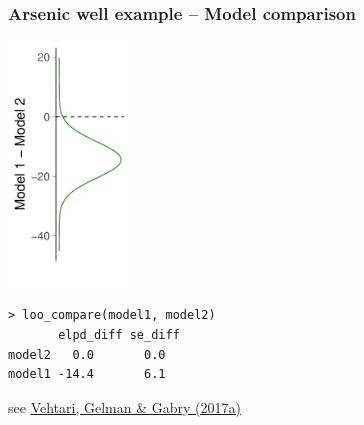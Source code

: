 \documentclass[english,t]{beamer}
\begin{document}
\begin{frame}[fragile]
  \frametitle{Arsenic well example -- Model comparison}

  {\includegraphics[height=6.5cm]{arsenicelpddiff_dens3.pdf}}
  \\
  {\scriptsize
\begin{lstlisting}
> loo_compare(model1, model2)
       elpd_diff se_diff
model2   0.0       0.0  
model1 -14.4       6.1  
\end{lstlisting}}
\vspace{-\baselineskip}
    {\scriptsize \hspace{6cm} see \href{http://link.springer.com/article/10.1007/s11222-016-9696-4}{Vehtari, Gelman \& Gabry (2017a)}}
    
\end{frame}
\end{document}
